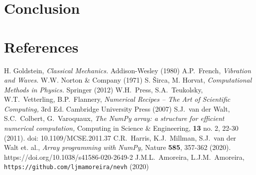 \documentclass{iopart}
\begin{document}
\section{Conclusion}

\section*{References}
\begin{thebibliography}{99}
   H. Goldstein, \textsl{Classical Mechanics.} Addison-Wesley
  (1980)
%
   A.P.~French, \textsl{Vibration and Waves.} W.W. Norton \&
  Company (1971)
%
   S. \v{S}irca, M. Horvat, \textsl{Computational Methods in
  Physics.} Springer (2012)
%
   W.H.~Press, S.A.~Teukolsky, W.T.~Vetterling, B.P.~Flannery,
  \textsl{Numerical Recipes -- The Art of Scientific Computing,} 3rd Ed.
  Cambridge University Press (2007)
%
   S.J.~van der Walt, S.C.~Colbert, G.~Varoquaux,
  \textsl{The NumPy array: a structure for efficient numerical computation,}
  Computing in Science \& Engineering, \textbf{13} no. 2, 22-30 (2011).
  doi: 10.1109/MCSE.2011.37
%
   C.R.~Harris, K.J.~Millman, S.J.~van der Walt et. al.,
  \textsl{Array programming with NumPy,} Nature \textbf{585}, 357-362 (2020).
  https://doi.org/10.1038/s41586-020-2649-2
%
   J.M.L.~Amoreira, L.J.M.~Amoreira,
  \texttt{https://github.com/ljmamoreira/nevh} (2020)

\end{thebibliography}
\end{document}
